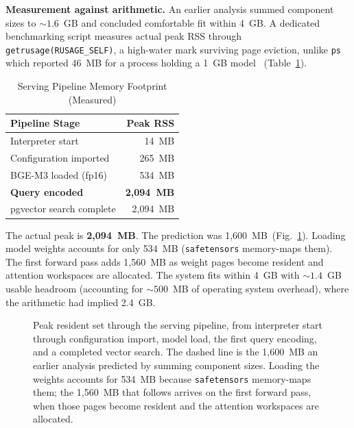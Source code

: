 \ifspringer\else
\textbf{Measurement against arithmetic.} An earlier analysis summed component sizes to ${\sim}1.6$~GB and concluded comfortable fit within 4~GB. A dedicated benchmarking script measures actual peak RSS through \texttt{getrusage(RUSAGE\_SELF)}, a high-water mark surviving page eviction, unlike \texttt{ps} which reported 46~MB for a process holding a 1~GB model \ifconf\else\ (Table~\ref{tab:footprint})\fi.
\fi

\ifconf\else  %
\begin{table}
\caption{Serving Pipeline Memory Footprint (Measured)}
\label{tab:footprint}
\centering
\begin{tabular}{@{}lr@{}}
\toprule
\textbf{Pipeline Stage} & \textbf{Peak RSS} \\
\midrule
Interpreter start & 14~MB \\
Configuration imported & 265~MB \\
BGE-M3 loaded (fp16) & 534~MB \\
\textbf{Query encoded} & \textbf{2,094~MB} \\
pgvector search complete & 2,094~MB \\
\bottomrule
\end{tabular}
\end{table}
\fi

The actual peak is \textbf{2,094~MB}. The prediction was 1,600~MB\ifconf\else\ (Fig.~\ref{fig:memory})\fi. Loading model weights accounts for only 534~MB (\texttt{safetensors} memory-maps them). The first forward pass adds 1,560~MB as weight pages become resident and attention workspaces are allocated. The system fits within 4~GB with ${\sim}1.4$~GB usable headroom (accounting for ${\sim}500$~MB of operating system overhead), where the arithmetic had implied 2.4~GB.

\ifconf\else  %
\begin{figure}
\centering
{}
\caption{Peak resident set through the serving pipeline, from interpreter start through configuration import, model load, the first query encoding, and a completed vector search. The dashed line is the 1,600~MB an earlier analysis predicted by summing component sizes. Loading the weights accounts for 534~MB because \texttt{safetensors} memory-maps them; the 1,560~MB that follows arrives on the first forward pass, when those pages become resident and the attention workspaces are allocated.}
\label{fig:memory}
\end{figure}
\fi

